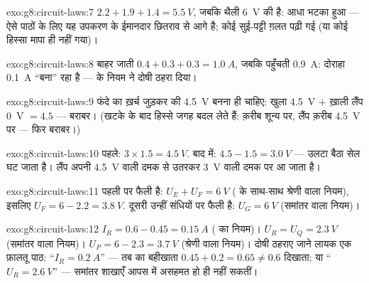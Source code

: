 \begin{solution}{exo:g8:circuit-laws:7}
$2.2 + 1.9 + 1.4 = \qty{5.5}{V}$, जबकि थैली \qty{6}{V} की है: आधा
 भटका हुआ --- ऐसे पाठों के लिए यह उपकरण के ईमानदार छितराव से आगे
है; कोई सुई-पट्टी ग़लत पढ़ी गई (या कोई हिस्सा मापा ही नहीं गया)।
\end{solution}

\begin{solution}{exo:g8:circuit-laws:8}
बाहर जाती $0.4 + 0.3 + 0.3 = \qty{1.0}{A}$, जबकि पहुँचती
\qty{0.9}{A}: दोराहा \qty{0.1}{A} ``बना'' रहा है ---  के नियम ने
दोषी ठहरा दिया।
\end{solution}

\begin{solution}{exo:g8:circuit-laws:9}
फंदे का ख़र्च जुड़कर  की \qty{4.5}{V} बनना ही चाहिए: खुला 
\qty{4.5}{V} $+$ ख़ाली लैंप \qty{0}{V} $= 4.5$ --- बराबर। (खटके के बाद
हिस्से जगह बदल लेते हैं:  क़रीब शून्य पर, लैंप क़रीब \qty{4.5}{V}
पर --- फिर बराबर।)
\end{solution}

\begin{solution}{exo:g8:circuit-laws:10}
पहले: $3 \times 1.5 = \qty{4.5}{V}$. बाद में: $4.5 - 1.5 =
\qty{3.0}{V}$ --- उलटा बैठा सेल घट जाता है। लैंप अपनी \qty{4.5}{V}
वाली दमक से उतरकर \qty{3}{V} वाली दमक पर आ जाता है।
\end{solution}

\begin{solution}{exo:g8:circuit-laws:11}
पहली   पर फैली है: $U_E + U_F = \qty{6}{V}$ ( के
साथ-साथ श्रेणी वाला  नियम), इसलिए $U_F = 6 - 2.2 =
\qty{3.8}{V}$. दूसरी  उन्हीं संधियों पर फैली है: $U_G =
\qty{6}{V}$ (समांतर वाला  नियम)।
\end{solution}

\begin{solution}{exo:g8:circuit-laws:12}
$I_R = 0.6 - 0.45 = \qty{0.15}{A}$ ( का नियम)। $U_R = U_Q =
\qty{2.3}{V}$ (समांतर वाला  नियम)। $U_P = 6 - 2.3 =
\qty{3.7}{V}$ (श्रेणी वाला  नियम)। दोषी ठहराए जाने लायक एक
फ़ालतू पाठ: ``$I_R = \qty{0.2}{A}$'' --- तब  का बहीखाता
$0.45 + 0.2 = 0.65 \neq 0.6$ दिखाता; या ``$U_R = \qty{2.6}{V}$'' ---
समांतर शाखाएँ आपस में असहमत हो ही नहीं सकतीं।
\end{solution}

